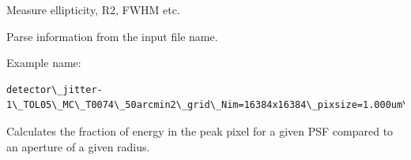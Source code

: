 \documentclass[a4paper,12pt,english]{sphinxmanual}
\begin{document}

\begin{fulllineitems}
\label{analysis:analysis.PSFproperties.measureChars}
Measure ellipticity, R2, FWHM etc.

\end{fulllineitems}


\begin{fulllineitems}
\label{analysis:analysis.PSFproperties.parseName}
Parse information from the input file name.

Example name:

\begin{Verbatim}[commandchars=\\\{\}]
detector\_jitter-1\_TOL05\_MC\_T0074\_50arcmin2\_grid\_Nim=16384x16384\_pixsize=1.000um\_lbda=800nm\_fieldX=-0.306\_fieldY=1.042.fits
\end{Verbatim}

\end{fulllineitems}


\begin{fulllineitems}
\label{analysis:analysis.PSFproperties.peakFraction}
Calculates the fraction of energy in the peak pixel for a given PSF compared
to an aperture of a given radius.

\end{fulllineitems}


\begin{fulllineitems}
\label{analysis:analysis.PSFproperties.plotEncircledEnergy}
\end{fulllineitems}

\end{document}
